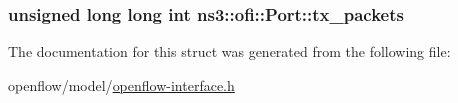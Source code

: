 \subsubsection[{\texorpdfstring{tx\+\_\+packets}{tx_packets}}]{\setlength{\rightskip}{0pt plus 5cm}unsigned {\bf long} {\bf long} int ns3\+::ofi\+::\+Port\+::tx\+\_\+packets}\hypertarget{structns3_1_1ofi_1_1Port_a60546b09a0ced40680fd636fd230eb33}{}\label{structns3_1_1ofi_1_1Port_a60546b09a0ced40680fd636fd230eb33}


The documentation for this struct was generated from the following file\+:\begin{DoxyCompactItemize}
\item 
openflow/model/\hyperlink{openflow-interface_8h}{openflow-\/interface.\+h}\end{DoxyCompactItemize}
